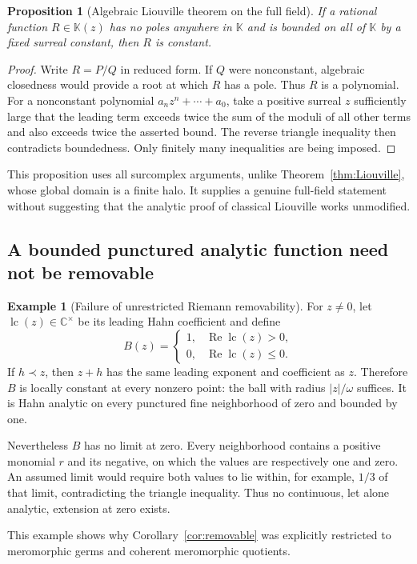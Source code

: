 \documentclass[11pt,a4paper]{article}
\newtheorem{proposition}[theorem]{Proposition}
\theoremstyle{definition}\newtheorem{definition}[theorem]{Definition}
\newtheorem{example}[theorem]{Example}
\theoremstyle{remark}\newtheorem{remark}[theorem]{Remark}
\newcommand{\K}{\mathbb K}
\newcommand{\C}{\mathbb C}\newcommand{\R}{\mathbb R}\newcommand{\N}{\mathbb N}\newcommand{\Z}{\mathbb Z}
\newcommand{\lc}{\operatorname{lc}}\newcommand{\id}{\operatorname{id}}
\numberwithin{equation}{section}
\begin{document}
\begin{proposition}[Algebraic Liouville theorem on the full field]\label{prop:rationalLiouville}
If a rational function $R\in\K(z)$ has no poles anywhere in $\K$ and is bounded on all of $\K$ by a fixed surreal constant, then $R$ is constant.
\end{proposition}
\begin{proof}
Write $R=P/Q$ in reduced form. If $Q$ were nonconstant, algebraic closedness would provide a root at which $R$ has a pole. Thus $R$ is a polynomial. For a nonconstant polynomial $a_nz^n+\cdots+a_0$, take a positive surreal $z$ sufficiently large that the leading term exceeds twice the sum of the moduli of all other terms and also exceeds twice the asserted bound. The reverse triangle inequality then contradicts boundedness. Only finitely many inequalities are being imposed.
\end{proof}
This proposition uses all surcomplex arguments, unlike Theorem~\ref{thm:Liouville}, whose global domain is a finite halo. It supplies a genuine full-field statement without suggesting that the analytic proof of classical Liouville works unmodified.

\subsection{A bounded punctured analytic function need not be removable}
\begin{example}[Failure of unrestricted Riemann removability]\label{ex:nonremovable}
For $z\ne0$, let $\lc(z)\in\C^\times$ be its leading Hahn coefficient and define
\[
 B(z)=\begin{cases}
 1,&\operatorname{Re}\lc(z)>0,\\
 0,&\operatorname{Re}\lc(z)\leq0.
 \end{cases}
\]
If $h\prec z$, then $z+h$ has the same leading exponent and coefficient as $z$. Therefore $B$ is locally constant at every nonzero point: the ball with radius $|z|/\omega$ suffices. It is Hahn analytic on every punctured fine neighborhood of zero and bounded by one.

Nevertheless $B$ has no limit at zero. Every neighborhood contains a positive monomial $r$ and its negative, on which the values are respectively one and zero. An assumed limit would require both values to lie within, for example, $1/3$ of that limit, contradicting the triangle inequality. Thus no continuous, let alone analytic, extension at zero exists.
\end{example}
This example shows why Corollary~\ref{cor:removable} was explicitly restricted to meromorphic germs and coherent meromorphic quotients.
\end{document}
